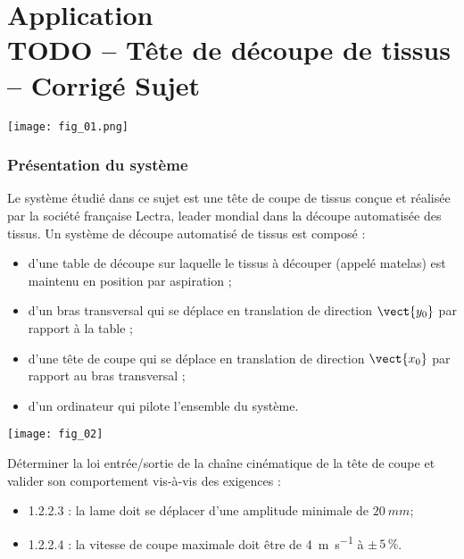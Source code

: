 \chapter*{Application  \\ 
TODO -- Tête de découpe de tissus -- \ifprof Corrigé \else Sujet \fi}

\iflivret {} \else
\ifprof  {} \else \fi
\fi


\marginnote[1cm]{
}


\begin{marginfigure}
\texttt{[image: fig\_01.png]}
\end{marginfigure}




\subsection*{Présentation du système}
\ifprof
\else
Le système étudié dans ce sujet est une tête de coupe de tissus conçue et réalisée par la société
française Lectra, leader mondial dans la découpe automatisée des tissus.
Un système de découpe automatisé de tissus est composé :
\begin{itemize}
\item d'une table de découpe sur laquelle le tissus à découper (appelé matelas) est maintenu en position
par aspiration ;
\item d'un bras transversal qui se déplace en translation de direction $\vect{y_0}$ par rapport à la table ;
\item d'une tête de coupe qui se déplace en translation de direction $\vect{x_0}$ par rapport au bras transversal ;
\item d'un ordinateur qui pilote l’ensemble du système. 
\end{itemize}

\begin{marginfigure}
\texttt{[image: fig\_02]}
\end{marginfigure}

\fi

\begin{obj}
Déterminer la loi entrée/sortie de la chaîne cinématique de la tête de coupe et valider son
comportement vis-à-vis des exigences :
\begin{itemize}
\item 1.2.2.3 : la lame doit se déplacer d'une amplitude minimale de $\SI{20}{mm}$;
\item 1.2.2.4 : la vitesse de coupe maximale doit être de \SI{4}{m.s^{-1}} à $\pm\,5\,\%$. 
\end{itemize}
\end{obj}


